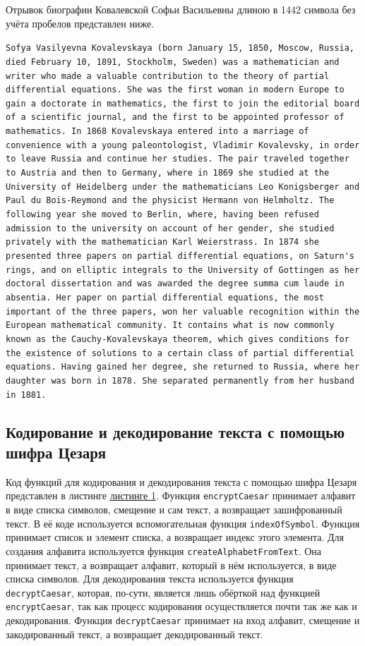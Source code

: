 \documentclass[11pt,a4paper,final]{article} %
\begin{document}
Отрывок биографии Ковалевской Софьи Васильевны длиною в 1442 символа без учёта пробелов представлен ниже.

\lstinline[stringstyle=\color{black}, keywordstyle=\color{black}\bfseries]|Sofya Vasilyevna Kovalevskaya (born January 15, 1850, Moscow, Russia, died February 10, 1891, Stockholm, Sweden) was a mathematician and writer who made a valuable contribution to the theory of partial differential equations. She was the first woman in modern Europe to gain a doctorate in mathematics, the first to join the editorial board of a scientific journal, and the first to be appointed professor of mathematics. In 1868 Kovalevskaya entered into a marriage of convenience with a young paleontologist, Vladimir Kovalevsky, in order to leave Russia and continue her studies. The pair traveled together to Austria and then to Germany, where in 1869 she studied at the University of Heidelberg under the mathematicians Leo Konigsberger and Paul du Bois-Reymond and the physicist Hermann von Helmholtz. The following year she moved to Berlin, where, having been refused admission to the university on account of her gender, she studied privately with the mathematician Karl Weierstrass. In 1874 she presented three papers on partial differential equations, on Saturn's rings, and on elliptic integrals to the University of Gottingen as her doctoral dissertation and was awarded the degree summa cum laude in absentia. Her paper on partial differential equations, the most important of the three papers, won her valuable recognition within the European mathematical community. It contains what is now commonly known as the Cauchy-Kovalevskaya theorem, which gives conditions for the existence of solutions to a certain class of partial differential equations. Having gained her degree, she returned to Russia, where her daughter was born in 1878. She separated permanently from her husband in 1881.|

\subsection{Кодирование и декодирование текста с помощью шифра Цезаря}

Код функций для кодирования и декодирования текста с помощью шифра Цезаря представлен в листинге \hyperref[lst:l1]{листинге 1}. Функция \texttt{encryptCaesar} принимает алфавит в виде списка символов, смещение и сам текст, а возвращает зашифрованный текст. В её коде используется вспомогательная функция \texttt{indexOfSymbol}. Функция принимает список и элемент списка, а возвращает индекс этого элемента. Для создания алфавита используется функция \texttt{createAlphabetFromText}. Она принимает текст, а возвращает алфавит, который в нём используется, в виде списка символов. Для декодирования текста используется функция \texttt{decryptCaesar}, которая, по-сути, является лишь обёрткой над функцией \texttt{encryptCaesar}, так как процесс кодирования осуществляется почти так же как и декодирования. Функция \texttt{decryptCaesar} принимает на вход алфавит, смещение и закодированный текст, а возвращает декодированный текст.
\end{document}
